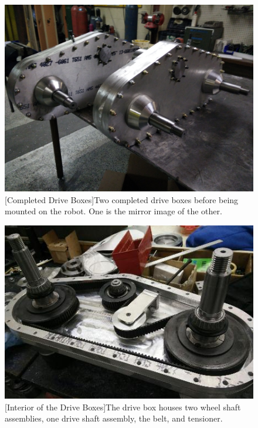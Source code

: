 \begin{figure}[htbp]
\centering
\begin{minipage}{0.45\linewidth} \centering
\includegraphics[height=0.22\textheight]{images/drive_box_assembly_NEW_bld}
[Completed Drive Boxes]{Two completed drive boxes before being mounted on the robot. One is the mirror image of the other.}
\label{fig:box_bld}
\end{minipage}
\hfill
\begin{minipage}{0.45\linewidth}
\centering
\includegraphics[height=0.22\textheight]{images/drive_box_open_bld}
[Interior of the Drive Boxes]{The drive box houses two wheel shaft assemblies, one drive shaft assembly, the belt, and tensioner.}
\label{fig:box_in}
\end{minipage}
\end{figure}


